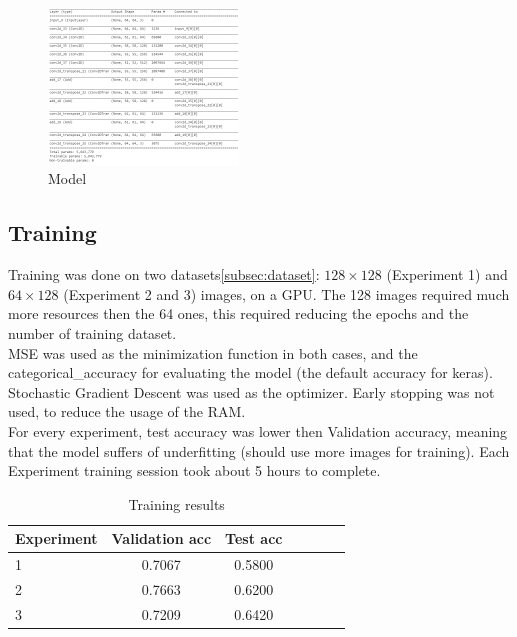 \documentclass[twocolumn,showpacs,%
  nofootinbib,aps,superscriptaddress,%
  eqsecnum,prd,notitlepage,showkeys,10pt]{revtex4-1}
\begin{document}
\begin{figure}[H]
    \includegraphics[width=0.45\textwidth]{images/model.PNG}
    \caption{\label{fig:noise}Model}
\end{figure}
\subsection{Training}
Training was done on two datasets\ref{subsec:dataset}: $128\times128$ (Experiment 1) and $64\times128$ (Experiment 2 and 3) images, on a GPU. The 128 images required much more resources then the 64 ones, this required reducing the epochs and the number of training dataset.\\
MSE was used as the minimization function in both cases, and the categorical\_accuracy for evaluating the model (the default accuracy for keras).\\
Stochastic Gradient Descent was used as the optimizer. Early stopping was not used, to reduce the usage of the RAM.\\
For every experiment, test accuracy was lower then Validation accuracy, meaning that the model suffers of underfitting (should use more images for training). 
Each Experiment training session took about 5 hours to complete.
\begin{table}[H] \label{tab:training}
    \centering
    \begin{tabular}{l|c|c|c|c|c|c}
    Experiment       &  Validation acc & Test acc \\\hline
    1          &  0.7067           & 0.5800            \\\hline
    2          &  0.7663        &   0.6200            \\\hline
    3          &  0.7209              &0.6420         
    \end{tabular}
    \caption{\label{tab:widgets}Training results}
    \end{table}
\end{document}
